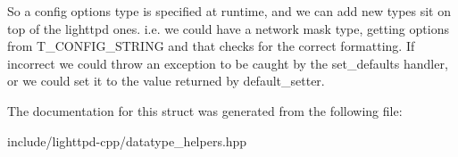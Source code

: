 So a config options type is specified at runtime, and we can add new types sit on top of the lighttpd ones. i.e. we could have a network mask type, getting options from T\_\-CONFIG\_\-STRING and that checks for the correct formatting. If incorrect we could throw an exception to be caught by the set\_\-defaults handler, or we could set it to the value returned by default\_\-setter. 

The documentation for this struct was generated from the following file:\begin{CompactItemize}
\item 
include/lighttpd-cpp/datatype\_\-helpers.hpp\end{CompactItemize}
